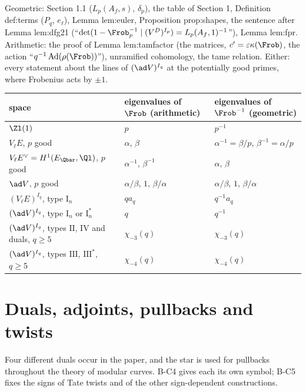 \begin{warning}\label{warn:notation:which-frobenius}
Geometric: Section 1.1 ($L_p(A_f,s)$, $\delta_p$), the table of Section 1, Definition def:terms ($P_q$, $e_\ell$), Lemma lem:euler,
Proposition prop:shapes, the sentence after Lemma lem:dfg21 (``$\det(1-\Frob_p^{-1}\mid(V^D)^{I_p})=L_p(A_f,1)^{-1}$''), Lemma lem:fpr. Arithmetic: the proof of Lemma lem:tamfactor (the matrices, $c'=\varepsilon\kappa(\Frob)$, the action
``$q^{-1}\operatorname{Ad}(\rho(\Frob))$''), unramified cohomology, the tame relation. Either: every statement about the lines
of $(\ad V)^{I_q}$ at the potentially good primes, where Frobenius acts by $\pm1$.
\end{warning}

\begin{center}\small
\begin{tabular}{@{}p{3.9cm}p{4.5cm}p{4.5cm}@{}}
\toprule
space & eigenvalues of $\Frob$ (arithmetic) & eigenvalues of $\Frob^{-1}$ (geometric)\\
\midrule
$\Zl(1)$ & $p$ & $p^{-1}$\\
$V_\ell E$, $p$ good & $\alpha$, $\beta$ & $\alpha^{-1}=\beta/p$, $\beta^{-1}=\alpha/p$\\
$V_\ell E^\vee=H^1(E_{\Qbar},\Ql)$, $p$ good & $\alpha^{-1}$, $\beta^{-1}$ & $\alpha$, $\beta$\\
$\ad V$, $p$ good & $\alpha/\beta$, $1$, $\beta/\alpha$ & $\alpha/\beta$, $1$, $\beta/\alpha$\\
$(V_\ell E)^{I_q}$, type $\mathrm I_n$ & $qa_q$ & $q^{-1}a_q$\\
$(\ad V)^{I_q}$, type $\mathrm I_n$ or $\mathrm I_n^*$ & $q$ & $q^{-1}$\\
$(\ad V)^{I_q}$, types $\mathrm{II}$, $\mathrm{IV}$ and duals, $q\ge5$ & $\chi_{-3}(q)$ & $\chi_{-3}(q)$\\
$(\ad V)^{I_q}$, types $\mathrm{III}$, $\mathrm{III}^*$, $q\ge5$ & $\chi_{-4}(q)$ & $\chi_{-4}(q)$\\
\bottomrule
\end{tabular}
\end{center}

\section{Duals, adjoints, pullbacks and twists}\label{sec:notation:duals}

Four different duals occur in the paper, and the star is used for pullbacks throughout the theory of modular curves. B-C4 gives
each its own symbol; B-C5 fixes the signs of Tate twists and of the other sign-dependent constructions.

